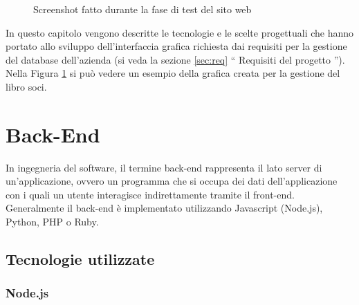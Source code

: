 \documentclass[12pt]{report}
\begin{document}
\begin{figure}[H]
	\caption{Screenshot fatto durante la fase di test del sito web}
	\label{fig:esempio_libro_soci}
\end{figure}

In questo capitolo vengono descritte le tecnologie e le scelte progettuali che hanno portato allo sviluppo dell'interfaccia grafica richiesta dai requisiti per la gestione del database dell'azienda (si veda la sezione \ref{sec:req} \textquotedblleft{} Requisiti del progetto \textquotedblright{}). Nella Figura \ref{fig:esempio_libro_soci} si può vedere un esempio della grafica creata per la gestione del libro soci.

%
\section{Back-End}

In ingegneria del software, il termine back-end rappresenta il lato server di un'applicazione, ovvero un programma che si occupa dei dati dell'applicazione con i quali un utente interagisce indirettamente tramite il front-end. Generalmente il back-end è implementato utilizzando Javascript (Node.js), Python, PHP o Ruby.

\subsection{Tecnologie utilizzate}

\subsubsection*{Node.js}
\end{document}
